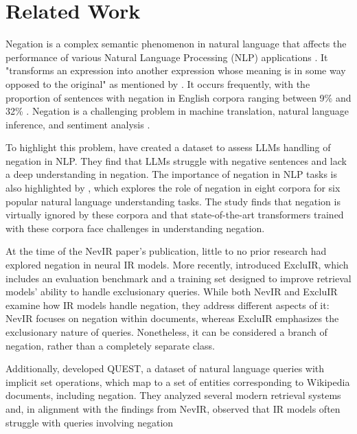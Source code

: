 
\section{Related Work}

Negation is a complex semantic phenomenon in natural language that affects the performance of various Natural Language Processing (NLP) applications \cite{sineva2021negation,morante2021recent}. It "transforms an expression into another expression whose meaning is in some way opposed to the original" as mentioned by \citet{morante2021recent}. It occurs frequently, with the proportion of sentences with negation in English corpora ranging between 9\% and 32\% \cite{sineva2021negation}. Negation is a challenging problem in machine translation, natural language inference, and sentiment analysis \cite{garcia2023not, sineva2021negation}.

To highlight this problem, \citet{garcia2023not} have created a dataset to assess LLMs handling of negation in NLP. They find that LLMs struggle with negative sentences and lack a deep understanding in negation. The importance of negation in NLP tasks is also highlighted by \citet{hossain2022analysis}, which explores the role of negation in eight corpora for six popular natural language understanding tasks. The study finds that negation is virtually ignored by these corpora and that state-of-the-art transformers trained with these corpora face challenges in understanding negation.

At the time of the NevIR paper's publication, little to no prior research had explored negation in neural IR models. More recently, \citet{zhang2024excluir} introduced ExcluIR, which includes an evaluation benchmark and a training set designed to improve retrieval models’ ability to handle exclusionary queries. While both NevIR and ExcluIR examine how IR models handle negation, they address different aspects of it: NevIR focuses on negation within documents, whereas ExcluIR emphasizes the exclusionary nature of queries. Nonetheless, it can be considered a branch of negation, rather than a completely separate class.

Additionally, \citet{malaviya2023quest} developed QUEST, a dataset of natural language queries with implicit set operations, which map to a set of entities corresponding to Wikipedia documents, including negation. They analyzed several modern retrieval systems and, in alignment with the findings from NevIR, observed that IR models often struggle with queries involving negation

